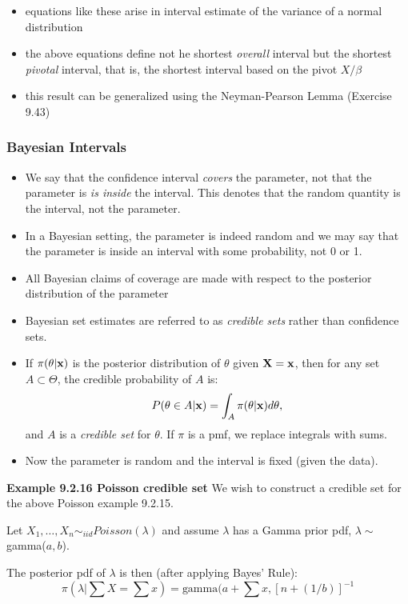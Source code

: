\documentclass[11pt,]{article}
\newcommand{\Xndots}{X_1, \ldots, X_n}
\def\bx{{\bf x}}
\def\bX{{\bf X}}
\def\inv{^{-1}}
\begin{document}
\begin{itemize}
\item equations like these arise in interval estimate of the variance of a normal distribution
\item the above equations define not he shortest {\em overall} interval but the shortest {\em pivotal} interval, that is, the shortest interval based on the pivot $X/\beta$
\item this result can be generalized using the Neyman-Pearson Lemma (Exercise 9.43)
\end{itemize}

\subsubsection{Bayesian Intervals}

\begin{itemize}
\item We say that the confidence interval {\em covers} the parameter, not that the parameter is {\em is inside} the interval. This denotes that the random quantity is the interval, not the parameter.
\item In a Bayesian setting, the parameter is indeed random and we may say that the parameter is inside an interval with some probability, not 0 or 1.
\item All Bayesian claims of coverage are made with respect to the posterior distribution of the parameter
\item Bayesian set estimates are referred to as {\em credible sets} rather than confidence sets.
\item If $\pi(\theta|\bx)$ is the posterior distribution of $\theta$ given $\bX = \bx$, then for any set $A \subset \Theta$, the credible probability of $A$ is:
$$P(\theta \in A |\bx) = \int_A \pi(\theta|\bx) d\theta,$$
and $A$ is a {\em credible set} for $\theta$. If $\pi$ is a pmf, we replace integrals with sums.
\item Now the parameter is random and the interval is fixed (given the data).
\end{itemize}

\noindent\textbf{Example 9.2.16 Poisson credible set} We wish to
construct a credible set for the above Poisson example 9.2.15.

Let \(\Xndots \sim_{iid} Poisson(\lambda)\) and assume \(\lambda\) has a
Gamma prior pdf, \(\lambda \sim\) gamma(\(a,b\)).

The posterior pdf of \(\lambda\) is then (after applying Bayes' Rule):
\[\pi(\lambda | \sum X  = \sum x) = \mbox{gamma}(a + \sum x, [n+(1/b)]\inv\]
\end{document}
